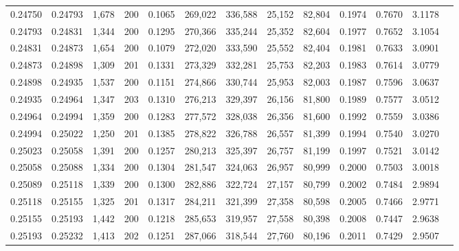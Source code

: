\begin{tabular}{rrrrrrrrrrrrr}
0.24750 & 0.24793 & 1,678 & 200 &                                     0.1065 & 269,022 & 336,588 &  25,152 &  82,804 & 0.1974 & 0.7670 & 3.1178 \\
0.24793 & 0.24831 & 1,344 & 200 &                                     0.1295 & 270,366 & 335,244 &  25,352 &  82,604 & 0.1977 & 0.7652 & 3.1054 \\
0.24831 & 0.24873 & 1,654 & 200 &                                     0.1079 & 272,020 & 333,590 &  25,552 &  82,404 & 0.1981 & 0.7633 & 3.0901 \\
0.24873 & 0.24898 & 1,309 & 201 &                                     0.1331 & 273,329 & 332,281 &  25,753 &  82,203 & 0.1983 & 0.7614 & 3.0779 \\
0.24898 & 0.24935 & 1,537 & 200 &                                     0.1151 & 274,866 & 330,744 &  25,953 &  82,003 & 0.1987 & 0.7596 & 3.0637 \\
0.24935 & 0.24964 & 1,347 & 203 &                                     0.1310 & 276,213 & 329,397 &  26,156 &  81,800 & 0.1989 & 0.7577 & 3.0512 \\
0.24964 & 0.24994 & 1,359 & 200 &                                     0.1283 & 277,572 & 328,038 &  26,356 &  81,600 & 0.1992 & 0.7559 & 3.0386 \\
0.24994 & 0.25022 & 1,250 & 201 &                                     0.1385 & 278,822 & 326,788 &  26,557 &  81,399 & 0.1994 & 0.7540 & 3.0270 \\
0.25023 & 0.25058 & 1,391 & 200 &                                     0.1257 & 280,213 & 325,397 &  26,757 &  81,199 & 0.1997 & 0.7521 & 3.0142 \\
0.25058 & 0.25088 & 1,334 & 200 &                                     0.1304 & 281,547 & 324,063 &  26,957 &  80,999 & 0.2000 & 0.7503 & 3.0018 \\
0.25089 & 0.25118 & 1,339 & 200 &                                     0.1300 & 282,886 & 322,724 &  27,157 &  80,799 & 0.2002 & 0.7484 & 2.9894 \\
0.25118 & 0.25155 & 1,325 & 201 &                                     0.1317 & 284,211 & 321,399 &  27,358 &  80,598 & 0.2005 & 0.7466 & 2.9771 \\
0.25155 & 0.25193 & 1,442 & 200 &                                     0.1218 & 285,653 & 319,957 &  27,558 &  80,398 & 0.2008 & 0.7447 & 2.9638 \\
0.25193 & 0.25232 & 1,413 & 202 &                                     0.1251 & 287,066 & 318,544 &  27,760 &  80,196 & 0.2011 & 0.7429 & 2.9507 \\

\end{tabular}

